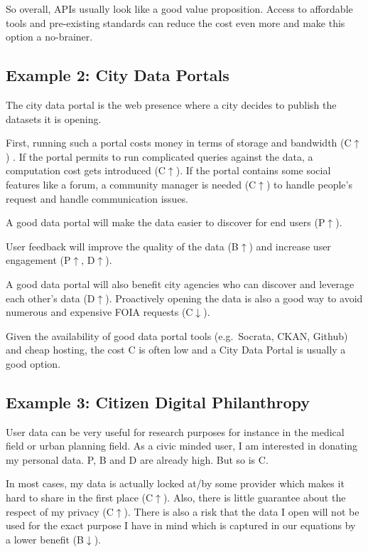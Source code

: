 \documentclass[]{acm_proc_article-sp}
\begin{document}
So overall, APIs usually look like a good value proposition. Access to
affordable tools and pre-existing standards can reduce the cost even
more and make this option a no-brainer.

\subsection{Example 2: City Data
Portals}\label{example-2-city-data-portals}

The city data portal is the web presence where a city decides to publish
the datasets it is opening.

First, running such a portal costs money in terms of storage and
bandwidth (C\(\uparrow\)) . If the portal permits to run complicated
queries against the data, a computation cost gets introduced
(C\(\uparrow\)). If the portal contains some social features like a
forum, a community manager is needed (C\(\uparrow\)) to handle people's
request and handle communication issues.

A good data portal will make the data easier to discover for end users
(P\(\uparrow\)).

User feedback will improve the quality of the data (B\(\uparrow\)) and
increase user engagement (P\(\uparrow\), D\(\uparrow\)).

A good data portal will also benefit city agencies who can discover and
leverage each other's data (D\(\uparrow\)). Proactively opening the data
is also a good way to avoid numerous and expensive FOIA requests
(C\(\downarrow\)).

Given the availability of good data portal tools (e.g.~Socrata, CKAN,
Github) and cheap hosting, the cost C is often low and a City Data
Portal is usually a good option.

\subsection{Example 3: Citizen Digital
Philanthropy}\label{example-3-citizen-digital-philanthropy}

User data can be very useful for research purposes for instance in the
medical field or urban planning field. As a civic minded user, I am
interested in donating my personal data. P, B and D are already high.
But so is C.

In most cases, my data is actually locked at/by some provider which
makes it hard to share in the first place (C\(\uparrow\)). Also, there
is little guarantee about the respect of my privacy (C\(\uparrow\)).
There is also a risk that the data I open will not be used for the exact
purpose I have in mind which is captured in our equations by a lower
benefit (B\(\downarrow\)).
\end{document}
